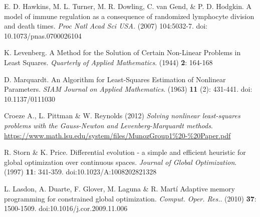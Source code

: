 \documentclass{article}
\begin{document}
    \clearpage
    \begin{thebibliography}{100}
        E. D. Hawkins, M. L. Turner, M. R. Dowling, C. van Gend, \& P. D. Hodgkin.
        A model of immune regulation as a consequence of randomized lymphocyte division and death times. \textit{Proc Natl Acad Sci USA.} (2007) 104:5032-7. doi: 10.1073/pnas.0700026104

        K. Levenberg.
        A Method for the Solution of Certain Non-Linear Problems in Least Squares. \textit{Quarterly of Applied Mathematics}. (1944) \textbf{2}: 164-168

        D. Marquardt.
        An Algorithm for Least-Squares Estimation of Nonlinear Parameters. \textit{SIAM Journal on Applied Mathematics}. (1963) \textbf{11} (2): 431-441. doi: 10.1137/0111030

        Croeze A., L. Pittman \& W. Reynolds (2012)
        \textit{Solving nonlinear least-squares problems with the Gauss-Newton and Levenberg-Marquardt methods}.
        \url{https://www.math.lsu.edu/system/files/MunozGroup1%20-%20Paper.pdf}

        R. Storn \& K. Price.
        Differential evolution - a simple and efficient heuristic for global optimization over continuous spaces. \textit{Journal of Global Optimization}. (1997) \textbf{11}: 341-359. doi:10.1023/A:1008202821328

        L. Lasdon, A. Duarte, F. Glover, M. Laguna \& R. Martí
        Adaptive memory programming for constrained global optimization. \textit{Comput. Oper. Res.}. (2010) \textbf{37}: 1500-1509. doi:10.1016/j.cor.2009.11.006

    \end{thebibliography}
    
    
    
\end{document}
